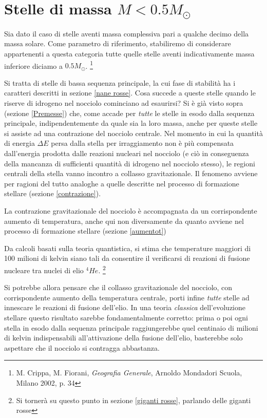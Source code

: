 \section{Stelle di massa $M<0.5M_{\odot}$}
Sia dato il caso di stelle aventi massa complessiva pari a qualche decimo della massa solare. Come parametro di riferimento, stabiliremo di considerare appartenenti a questa categoria tutte quelle stelle aventi indicativamente massa inferiore diciamo a $0.5 M_{\odot}$.
\footnote{M. Crippa, M. Fiorani, \emph{Geografia Generale}, Arnoldo Mondadori Scuola, Milano 2002, p. 34}
\par
Si tratta di stelle di bassa sequenza principale, la cui fase di stabilit\`{a} ha i caratteri descritti in sezione \ref{nane rosse}. Cosa succede a queste stelle quando le riserve di idrogeno nel nocciolo cominciano ad esaurirsi? Si è gi\`{a} visto sopra (sezione \ref {Premesse}) che, come accade per \emph{tutte} le stelle in esodo dalla sequenza principale, indipendentemente da quale sia la loro massa, anche per queste stelle si assiste ad una contrazione del nocciolo centrale.
Nel momento in cui la quantit\`{a} di energia $\Delta E$ persa dalla stella per irraggiamento non è più compensata dall'energia prodotta dalle reazioni nucleari nel nocciolo (e ciò in conseguenza della mancanza di sufficienti quantit\`{a} di idrogeno nel nocciolo stesso), le regioni centrali della stella vanno incontro a collasso gravitazionale. Il fenomeno avviene per ragioni del tutto analoghe a quelle descritte nel processo di formazione stellare (sezione \ref{contrazione}).
\par
La contrazione gravitazionale del nocciolo è accompagnata da un corrispondente aumento di temperatura, anche qui non diversamente da quanto avviene nel processo di formazione stellare (sezione \ref{aumentot})
\par
Da calcoli basati sulla teoria quantistica, si stima che temperature maggiori di 100 milioni di kelvin \Cite{kittel} siano tali da consentire il verificarsi di reazioni di fusione nucleare tra nuclei di elio $^{4}He$. \footnote{Si torner\`{a} su questo punto in sezione \ref{giganti rosse}, parlando delle giganti rosse}
\par
Si potrebbe allora pensare che il collasso gravitazionale del nocciolo, con corrispondente aumento della temperatura centrale, porti infine \emph{tutte} stelle ad innescare le reazioni di fusione dell'elio. In una teoria \emph{classica} dell'evoluzione stellare questo risultato sarebbe fondamentalmente corretto: prima o poi ogni stella in esodo dalla sequenza principale raggiungerebbe quel centinaio di milioni di kelvin indispensabili all'attivazione della fusione dell'elio, basterebbe solo aspettare che il nocciolo si contragga abbastanza.
